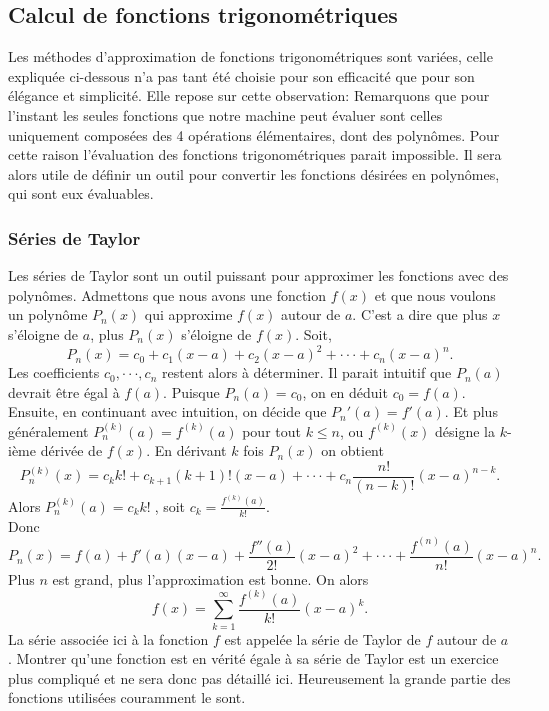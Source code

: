 \documentclass{article}
\begin{document}
\subsection{Calcul de fonctions trigonométriques}
Les méthodes d'approximation de fonctions trigonométriques sont variées, celle expliquée ci-dessous n'a pas tant été choisie pour son efficacité que pour son élégance et simplicité. Elle repose sur cette observation:
Remarquons que pour l'instant les seules fonctions que notre machine peut évaluer sont celles uniquement composées des 4 opérations élémentaires, dont des polynômes. Pour cette raison l'évaluation des fonctions trigonométriques parait impossible. Il sera alors utile de définir un outil pour convertir les fonctions désirées en polynômes, qui sont eux évaluables.
\subsubsection{Séries de Taylor}
Les séries de Taylor sont un outil puissant pour approximer les fonctions avec des polynômes. Admettons que nous avons une fonction $f(x)$ et que nous voulons un polynôme $P_n(x)$ qui approxime $f(x)$ autour de $a$. C'est a dire que plus $x$ s'éloigne de $a$, plus $P_n(x)$ s'éloigne de $f(x)$. Soit,
$$P_n(x) = c_0 + c_1(x-a) + c_2(x-a)^2+\cdot\cdot\cdot+c_n(x-a)^n.$$
Les coefficients $c_0, \cdot\cdot\cdot,c_n$ restent alors à déterminer.
Il parait intuitif que $P_n(a)$ devrait être égal à $f(a)$. Puisque $P_n(a) = c_0$, on en déduit $c_0=f(a)$. Ensuite, en continuant avec intuition, on décide que $P_n'(a) = f'(a)$. Et plus généralement $P_n^{(k)}(a) = f^{(k)}(a)$ pour tout $k\le n$, ou $f^{(k)}(x)$ désigne la $k$-ième dérivée de $f(x)$. En dérivant $k$ fois $P_n(x)$ on obtient
$$
P_n^{(k)}(x) = c_kk!+c_{k+1}(k+1)!(x-a)+\cdot\cdot\cdot+c_n\frac{n!}{(n-k)!}(x-a)^{n-k}.
$$
Alors $P_n^{(k)}(a) = c_kk!\;$, soit $c_k = \frac{f^{(k)}(a)}{k!}$.\\
Donc
$$P_n(x) = f(a) + f'(a)(x-a) + \frac{f''(a)}{2!}(x-a)^2+\cdot\cdot\cdot+\frac{f^{(n)}(a)}{n!}(x-a)^n.$$
Plus $n$ est grand, plus l'approximation est bonne.
On alors
$$f(x) = \sum_{k=1}^{\infty}\frac{f^{(k)}(a)}{k!}(x-a)^k.$$
La série associée ici à la fonction $f$ est appelée la série de Taylor de $f$ autour de $a$. Montrer qu'une fonction est en vérité égale à sa série de Taylor est un exercice plus compliqué et ne sera donc pas détaillé ici. Heureusement la grande partie des fonctions utilisées couramment le sont.
\end{document}
